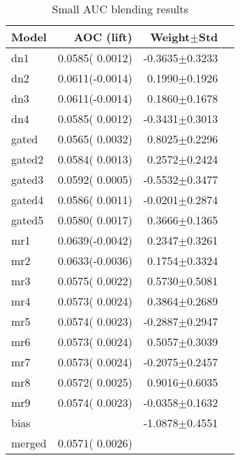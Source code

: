 \documentclass{article}
\begin{document}
\begin{table}[t]
\caption{Small AUC blending results}
\label{problems}
\vskip 0.15in
\begin{center}
\begin{small}
\begin{sc}
\begin{tabular}{lrrr}
\hline
\abovespace\belowspace
Model & AOC (lift) & Weight$\pm$Std \\
\hline
\abovespace
dn1        & 0.0585( 0.0012) & -0.3635$\pm$0.3233 \\
dn2        & 0.0611(-0.0014) &  0.1990$\pm$0.1926 \\
dn3        & 0.0611(-0.0014) &  0.1860$\pm$0.1678 \\
dn4        & 0.0585( 0.0012) & -0.3431$\pm$0.3013 \\
\abovespace
gated      & 0.0565( 0.0032) &  0.8025$\pm$0.2296 \\
gated2     & 0.0584( 0.0013) &  0.2572$\pm$0.2424 \\
gated3     & 0.0592( 0.0005) & -0.5532$\pm$0.3477 \\
gated4     & 0.0586( 0.0011) & -0.0201$\pm$0.2874 \\
gated5     & 0.0580( 0.0017) &  0.3666$\pm$0.1365 \\
\abovespace
mr1        & 0.0639(-0.0042) &  0.2347$\pm$0.3261 \\
mr2        & 0.0633(-0.0036) &  0.1754$\pm$0.3324 \\
mr3        & 0.0575( 0.0022) &  0.5730$\pm$0.5081 \\
mr4        & 0.0573( 0.0024) &  0.3864$\pm$0.2689 \\
mr5        & 0.0574( 0.0023) & -0.2887$\pm$0.2947 \\
mr6        & 0.0573( 0.0024) &  0.5057$\pm$0.3039 \\
mr7        & 0.0573( 0.0024) & -0.2075$\pm$0.2457 \\
mr8        & 0.0572( 0.0025) &  0.9016$\pm$0.6035 \\
mr9        & 0.0574( 0.0023) & -0.0358$\pm$0.1632 \\
\abovespace
bias       &                 & -1.0878$\pm$0.4551 \\
\abovespace\belowspace
merged     & 0.0571( 0.0026) &                    \\
\hline
\end{tabular}
\end{sc}
\end{small}
\end{center}
\vskip -0.1in
\end{table}
\end{document}

